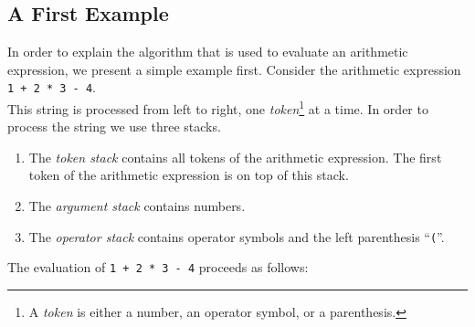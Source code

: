 \subsection{A First Example}
In order to explain the algorithm that is used to evaluate an arithmetic expression, we present a
simple example first.  Consider the arithmetic expression 
\\[0.2cm]
\hspace*{1.3cm} 
\texttt{1 + 2 * 3 - 4}. 
\\[0.2cm]
This string is processed from left to right, one \emph{token}\footnote{A \emph{token} is either a
  number, an operator symbol, or a parenthesis.}
 at a time.  In order to process the string we use three stacks.
\begin{enumerate}
\item The  \emph{token stack} contains all tokens of the arithmetic expression. 
      The first token of the arithmetic expression is on top of this stack.
\item The  \emph{argument stack} contains numbers.
\item The \emph{operator stack} contains operator symbols and the left parenthesis ``\texttt{(}''.
\end{enumerate}
The evaluation of \texttt{1 + 2 * 3 - 4} proceeds as follows:
